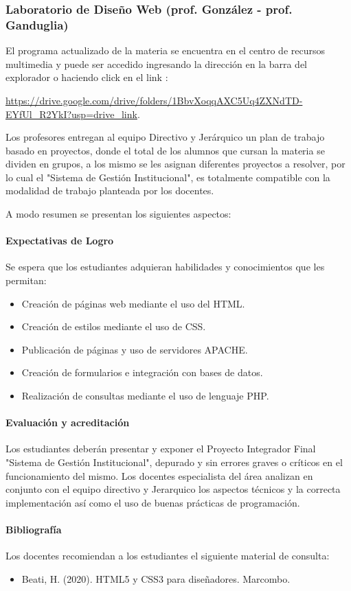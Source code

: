 \subsubsection{Laboratorio de Diseño Web (prof. González - prof. Ganduglia)}
El programa actualizado de la materia se encuentra en el centro de recursos multimedia y puede ser accedido ingresando la dirección en la barra del explorador o haciendo click en el link :


\url{https://drive.google.com/drive/folders/1BbvXoqqAXC5Uq4ZXNdTD-EYfUl_R2YkI?usp=drive_link}.



Los profesores entregan al equipo Directivo y Jerárquico un plan de trabajo basado en proyectos, donde el total de los alumnos que cursan la materia se dividen en grupos, a los mismo se les asignan diferentes proyectos a resolver, por lo cual el "Sistema de Gestión Institucional", es totalmente compatible con la modalidad de trabajo planteada por los docentes.

A modo resumen se presentan los siguientes aspectos:
\paragraph{Expectativas de Logro}
Se espera que los estudiantes adquieran habilidades y conocimientos que les permitan: 

\begin{itemize}
    \item Creación de páginas web mediante el uso del HTML.
    \item Creación de estilos mediante el uso de CSS.
    \item Publicación de páginas y uso de servidores APACHE.
    \item Creación de formularios e integración con bases de datos.
    \item Realización de consultas mediante el uso de lenguaje PHP.

\end{itemize}

\paragraph{Evaluación y acreditación}

Los estudiantes deberán presentar y exponer el Proyecto Integrador Final "Sistema de Gestión Institucional", depurado y sin errores graves o críticos en el funcionamiento del mismo. Los docentes especialista del área analizan en conjunto con el equipo directivo y Jerarquico los aspectos técnicos y la correcta implementación así como el uso de buenas prácticas de programación.

\paragraph{Bibliografía} Los docentes recomiendan a los estudiantes el siguiente material de consulta:

\begin{itemize}
    \item Beati, H. (2020). HTML5 y CSS3 para diseñadores. Marcombo.
\end{itemize}